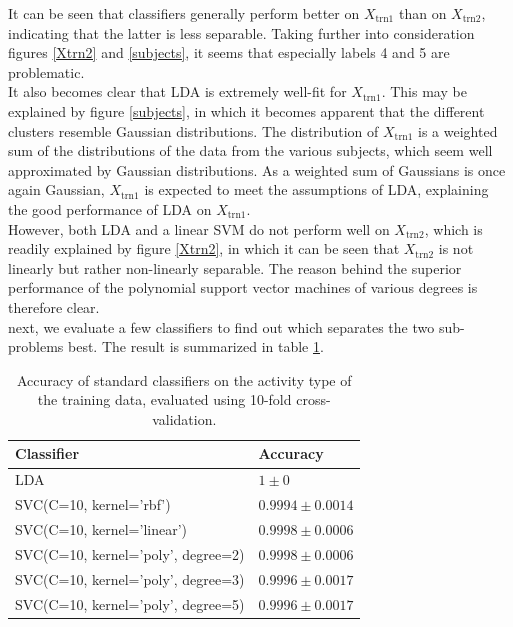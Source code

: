 \documentclass [a4paper] {report}
\begin{document}
	\noindent
	It can be seen that classifiers generally perform better on $X_{\text{trn1}}$ than on $X_{\text{trn2}}$, indicating that the latter is less separable. Taking further into consideration figures \ref{Xtrn2} and \ref{subjects}, it seems that especially labels 4 and 5 are problematic. \\
	It also becomes clear that LDA is extremely well-fit for $X_{\text{trn1}}$. This may be explained by figure \ref{subjects}, in which it becomes apparent that the different clusters resemble Gaussian distributions. The distribution of $X_{\text{trn1}}$ is a weighted sum of the distributions of the data from the various subjects, which seem well approximated by Gaussian distributions. As a weighted sum of Gaussians is once again Gaussian, $X_{\text{trn1}}$ is expected to meet the assumptions of LDA, explaining the good performance of LDA on $X_{\text{trn1}}$. \\
	However, both LDA and a linear SVM do not perform well on $X_{\text{trn2}}$, which is readily explained by figure \ref{Xtrn2}, in which it can be seen that $X_{\text{trn2}}$ is not linearly but rather non-linearly separable. The reason behind the superior performance of the polynomial support vector machines of various degrees is therefore clear.\\
	
	\noindent
	next, we evaluate a few classifiers to find out which separates the two sub-problems best. The result is summarized in table \ref{tab:separator}.
	
	\begin{table}[H]
		\centering
		\caption{Accuracy of standard classifiers on the activity type of the training data, evaluated using 10-fold cross-validation.}
		\label{tab:separator}
		\begin{tabular}{l|l}
			Classifier 							& Accuracy  \\ \hline
			LDA 								& $1 \pm 0 $\\
			SVC(C=10, kernel='rbf') 			& $0.9994 \pm 0.0014 $\\
			SVC(C=10, kernel='linear') 			& $0.9998 \pm 0.0006 $\\
			SVC(C=10, kernel='poly', degree=2) 	& $0.9998 \pm 0.0006 $\\
			SVC(C=10, kernel='poly', degree=3) 	& $0.9996 \pm 0.0017 $\\
			SVC(C=10, kernel='poly', degree=5) 	& $0.9996 \pm 0.0017 $\\
		\end{tabular}		
	\end{table}
	
\end{document}
